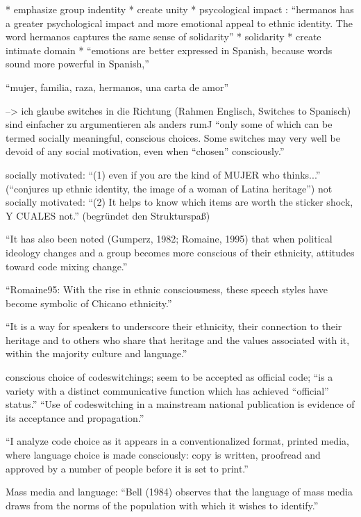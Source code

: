* emphasize group indentity
* create unity
* psycological impact : ``hermanos has a greater psychological
impact and more emotional appeal to ethnic identity. The word hermanos captures the
same sense of solidarity''
* solidarity
* create intimate domain
* ``emotions are better expressed in Spanish, because words sound more
powerful in Spanish,''

``mujer, familia, raza, hermanos, una carta de amor''

--> ich glaube switches in die Richtung (Rahmen Englisch, Switches to Spanisch) sind einfacher zu argumentieren als anders rum^^

``only some of which can be termed socially meaningful,
conscious choices. Some switches may very well be devoid of any social motivation,
even when “chosen” consciously.''

socially motivated: ``(1) even if you are the kind of MUJER who thinks...'' (``conjures up ethnic identity, the image of a woman of Latina heritage'')
not socially motivated: ``(2) It helps to know which items are worth the sticker shock, Y CUALES not.'' (begründet den Strukturspaß)

``It has also been noted (Gumperz, 1982; Romaine, 1995) that when political ideology
changes and a group becomes more conscious of their ethnicity, attitudes toward code
mixing change.''

``Romaine95: With the rise in ethnic
consciousness, these speech styles have become symbolic of Chicano ethnicity.''

``It is a way for speakers to underscore their ethnicity,
their connection to their heritage and to others who share that heritage and the values
associated with it, within the majority culture and language.''

conscious choice of codeswitchings;
seem to be accepted as official code; ``is a variety with a distinct communicative function which
has achieved “official” status.''
``Use of codeswitching in a mainstream national publication is evidence of its
acceptance and propagation.''

``I analyze code choice as it appears in a conventionalized format, printed media,
where language choice is made consciously: copy is written, proofread and approved
by a number of people before it is set to print.''

Mass media and language: ``Bell (1984) observes that the language of mass media draws from the norms of
the population with which it wishes to identify.''

